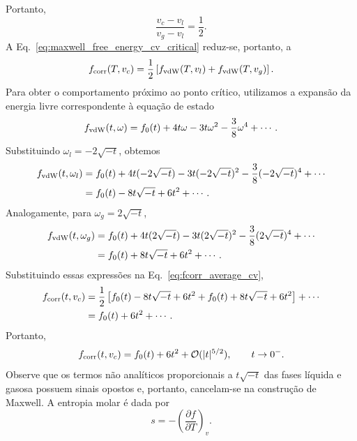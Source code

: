 \documentclass[11pt,a4paper]{article}
\newcommand{\pd}[2]{\frac{\partial #1}{\partial #2}}
\begin{document}
%
Portanto,
%
\begin{equation}
    \frac{v_c-v_l}{v_g-v_l}
    =
    \frac12.
\end{equation}
%
A Eq.~\eqref{eq:maxwell_free_energy_cv_critical} reduz-se, portanto,
a
%
\begin{equation}
    f_{\rm corr}(T,v_c)
    =
    \frac12
    \left[
    f_{\rm vdW}(T,v_l)
    +
    f_{\rm vdW}(T,v_g)
    \right].
    \label{eq:fcorr_average_cv}
\end{equation}
%
Para obter o comportamento próximo ao ponto crítico, utilizamos a
expansão da energia livre correspondente à equação de estado
%
\begin{equation}
    f_{\rm vdW}(t,\omega)
    =
    f_0(t)
    +
    4t\omega
    -3t\omega^2
    -\frac38\omega^4
    +\cdots.
    \label{eq:fvdw_expansion_cv}
\end{equation}
%
Substituindo $\omega_l=-2\sqrt{-t}$, obtemos
%
\begin{align}
    f_{\rm vdW}(t,\omega_l)
    &=
    f_0(t)
    +4t(-2\sqrt{-t})
    -3t(-2\sqrt{-t})^2
    -\frac38(-2\sqrt{-t})^4
    +\cdots
    \nonumber\\
    &=
    f_0(t)
    -8t\sqrt{-t}
    +6t^2
    +\cdots.
\end{align}
%
Analogamente, para $\omega_g=2\sqrt{-t}$,
%
\begin{align}
    f_{\rm vdW}(t,\omega_g)
    &=
    f_0(t)
    +4t(2\sqrt{-t})
    -3t(2\sqrt{-t})^2
    -\frac38(2\sqrt{-t})^4
    +\cdots
    \nonumber\\
    &=
    f_0(t)
    +8t\sqrt{-t}
    +6t^2
    +\cdots.
\end{align}
%
Substituindo essas expressões na Eq.~\eqref{eq:fcorr_average_cv},
%
\begin{align}
    f_{\rm corr}(t,v_c)
    &=
    \frac12
    \left[
    f_0(t)
    -8t\sqrt{-t}
    +6t^2
    +
    f_0(t)
    +8t\sqrt{-t}
    +6t^2
    \right]
    +\cdots
    \nonumber\\
    &=
    f_0(t)+6t^2+\cdots.
\end{align}
%
Portanto,
%
\begin{equation}
    f_{\rm corr}(t,v_c)
    =
    f_0(t)+6t^2+\mathcal{O}(|t|^{5/2}),
    \qquad t\to0^-.
    \label{eq:fcorr_negative_cv}
\end{equation}
%
Observe que os termos não analíticos proporcionais a
$t\sqrt{-t}$ das fases líquida e gasosa possuem sinais opostos e, portanto, cancelam-se na construção de Maxwell.
%
A entropia molar é dada por
%
\begin{equation}
    s
    =
    -\left(\pd{f}{T}\right)_v.
\end{equation}
\end{document}
